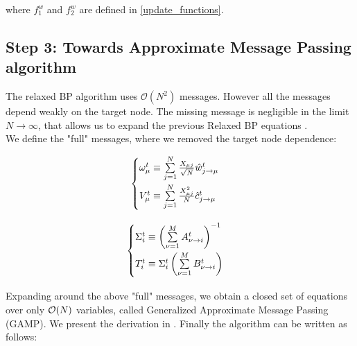 \documentclass[aip,jmp,amsmath,amssymb,reprint]{revtex4}
\begin{document}
where $f_1^w$ and $f_2^w$ are defined in \ref{update_functions}.


\subsection{Step 3: Towards Approximate Message Passing algorithm}
The relaxed BP algorithm uses $\mathcal{O}(N^2)$ messages. However all the messages depend weakly on the target node. The missing message is negligible in the limit $N \to \infty$, that allows us to expand the previous Relaxed BP equations \Eq{\ref{supp:relaxed_BP}}.\\

We define the "full" messages, where we removed the target node dependence:\\
\begin{minipage}[c]{.46\linewidth}
\begin{equation*}
	\begin{cases}
		\omega_{\mu}^t \equiv \sum\limits_{j = 1}^N \frac{X_{\mu j}}{\sqrt{N}}   \hat{w}_{j\to \mu}^t\vspace{0.1cm} \\
		V_{\mu}^t \equiv  \sum\limits_{j=1}^N \frac{X_{\mu j}^2}{N}   \hat{c}_{j\to \mu}^t\vspace{0.1cm} \\
	\end{cases}
\end{equation*}
\end{minipage} \hfill
\begin{minipage}[c]{.46\linewidth}
\begin{equation}
	\begin{cases}
		\Sigma_{i  }^t \equiv  \left( \sum\limits_{\nu =1}^M  A_{\nu \to i}^t \right )^{-1} \vspace{0.1cm} \\
	T_{i }^t \equiv  \Sigma_{i}^t  \left( \sum\limits_{\nu =1}^M  B_{\nu \to i}^t \right)\vspace{0.1cm} \\
	\end{cases}
\end{equation}
\end{minipage}

Expanding \Eq{\ref{supp:relaxed_BP}} around the above "full" messages, we obtain a closed set of equations over only $\mathcal{O}(N)$ variables, called Generalized Approximate Message Passing (GAMP). We present the derivation in \Eq{\ref{appendix:towardsAMP}}. Finally the algorithm can be written as follows:
\end{document}
